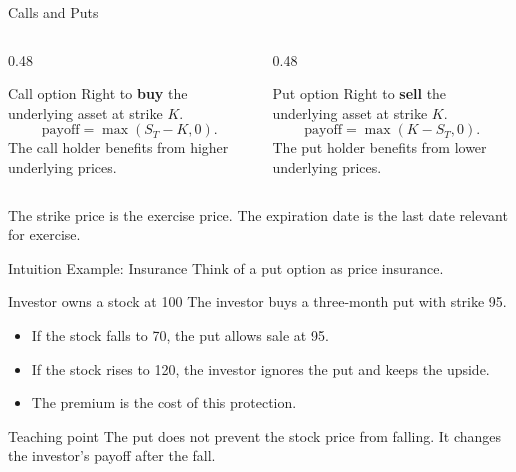 \documentclass[aspectratio=169,11pt]{beamer}
\begin{document}
\begin{frame}{Calls and Puts}
    \begin{columns}[T]
        \begin{column}{0.48\textwidth}
            \begin{block}{Call option}
                Right to \textbf{buy} the underlying asset at strike \(K\).
                \[
                    \text{payoff}=\max(S_T-K,0).
                \]
                The call holder benefits from higher underlying prices.
            \end{block}
        \end{column}
        \begin{column}{0.48\textwidth}
            \begin{block}{Put option}
                Right to \textbf{sell} the underlying asset at strike \(K\).
                \[
                    \text{payoff}=\max(K-S_T,0).
                \]
                The put holder benefits from lower underlying prices.
            \end{block}
        \end{column}
    \end{columns}

    \vspace{0.6em}
    The strike price is the exercise price. The expiration date is the last date relevant for exercise.
\end{frame}

\begin{frame}{Intuition Example: Insurance}
    Think of a put option as price insurance.

    \begin{exampleblock}{Investor owns a stock at 100}
        The investor buys a three-month put with strike 95.
        \begin{itemize}
            \item If the stock falls to 70, the put allows sale at 95.
            \item If the stock rises to 120, the investor ignores the put and keeps the upside.
            \item The premium is the cost of this protection.
        \end{itemize}
    \end{exampleblock}

    \begin{block}{Teaching point}
        The put does not prevent the stock price from falling.
        It changes the investor's payoff after the fall.
    \end{block}
\end{frame}
\end{document}

